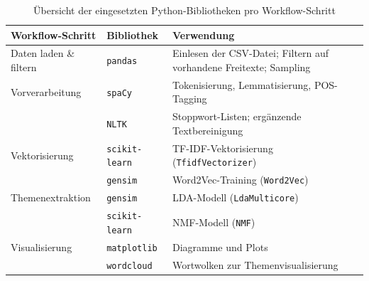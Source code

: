 \documentclass[a4paper,11pt]{article}
\renewcommand{\footnotesize}{\fontsize{10}{12}\selectfont}
\begin{document}
\begin{table}[H]
\centering
\caption{Übersicht der eingesetzten Python-Bibliotheken pro Workflow-Schritt}
\label{tab:bibliotheken}
\footnotesize
\setlength{\parskip}{0pt}
\renewcommand{\arraystretch}{1.4}
\begin{tabular}{>{\raggedright\arraybackslash}p{3.0cm} p{2.5cm} p{7.5cm}}
\toprule
\textbf{Workflow-Schritt} & \textbf{Bibliothek} & \textbf{Verwendung} \\
\midrule
Daten laden \& filtern & \texttt{pandas} & Einlesen der CSV-Datei; Filtern auf vorhandene Freitexte; Sampling \\
\hline
Vorverarbeitung & \texttt{spaCy} & Tokenisierung, Lemmatisierung, POS-Tagging \\
\cline{2-3}
 & \texttt{NLTK} & Stoppwort-Listen; ergänzende Textbereinigung \\
\hline
Vektorisierung & \texttt{scikit-learn} & TF-IDF-Vektorisierung (\texttt{TfidfVectorizer}) \\
\cline{2-3}
 & \texttt{gensim} & Word2Vec-Training (\texttt{Word2Vec}) \\
\hline
Themenextraktion & \texttt{gensim} & LDA-Modell (\texttt{LdaMulticore}) \\
\cline{2-3}
 & \texttt{scikit-learn} & NMF-Modell (\texttt{NMF}) \\
\hline
Visualisierung & \texttt{matplotlib} & Diagramme und Plots \\
\cline{2-3}
 & \texttt{wordcloud} & Wortwolken zur Themenvisualisierung \\
\bottomrule
\end{tabular}
\end{table}
\end{document}
